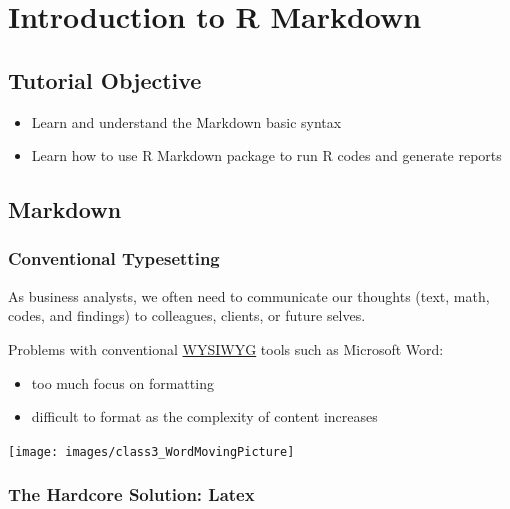 \documentclass[
  11pt,
]{book}
\providecommand{\tightlist}{%
  \setlength{\itemsep}{0pt}\setlength{\parskip}{0pt}}
\begin{document}
\hypertarget{introduction-to-r-markdown}{%
\chapter{Introduction to R Markdown}\label{introduction-to-r-markdown}}

\hypertarget{tutorial-objective}{%
\section{Tutorial Objective}\label{tutorial-objective}}

\begin{itemize}
\item
  Learn and understand the Markdown basic syntax
\item
  Learn how to use R Markdown package to run R codes and generate reports
\end{itemize}

\hypertarget{markdown}{%
\section{Markdown}\label{markdown}}

\hypertarget{conventional-typesetting}{%
\subsection{Conventional Typesetting}\label{conventional-typesetting}}

As business analysts, we often need to communicate our thoughts (text, math, codes, and findings) to colleagues, clients, or future selves.

Problems with conventional \href{https://en.wikipedia.org/wiki/WYSIWYG}{WYSIWYG} tools such as Microsoft Word:

\begin{itemize}
\tightlist
\item
  too much focus on formatting
\item
  difficult to format as the complexity of content increases
\end{itemize}

\begin{center}\texttt{[image: images/class3\_WordMovingPicture]} \end{center}

\hypertarget{the-hardcore-solution-latex}{%
\subsection{The Hardcore Solution: Latex}\label{the-hardcore-solution-latex}}
\end{document}
